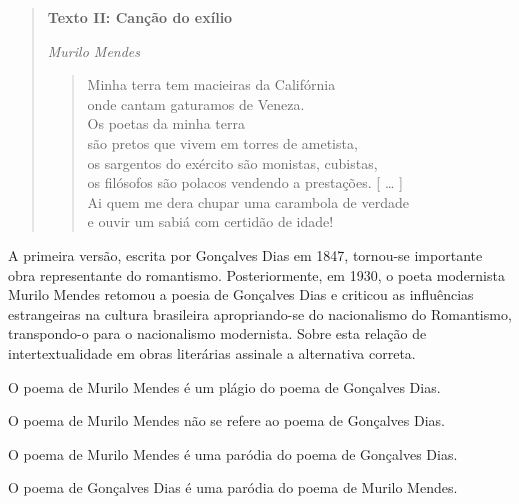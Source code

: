 


\begin{quote}

\textbf{Texto II: Canção do exílio}

\emph{Murilo Mendes}

\begin{verse}

Minha terra tem macieiras da Califórnia \\

onde cantam gaturamos de Veneza. \\

Os poetas da minha terra \\

são pretos que vivem em torres de ametista, \\

os sargentos do exército são monistas, cubistas, \\

os filósofos são polacos vendendo a prestações. {[} \ldots{} {]} \\

Ai quem me dera chupar uma carambola de verdade \\

e ouvir um sabiá com certidão de idade!

\end{verse}

\end{quote}


A primeira versão, escrita por Gonçalves Dias em 1847, tornou-se
importante obra representante do romantismo. Posteriormente, em 1930, o
poeta modernista Murilo Mendes retomou a poesia de Gonçalves Dias e
criticou as influências estrangeiras na cultura brasileira
apropriando-se do nacionalismo do Romantismo, transpondo-o para o
nacionalismo modernista. Sobre esta relação de
intertextualidade em obras literárias assinale a alternativa correta.

\begin{escolha}

  \item O poema de Murilo Mendes é um plágio do poema de Gonçalves Dias.

  \item O poema de Murilo Mendes não se refere ao poema de Gonçalves Dias.

  \item O poema de Murilo Mendes é uma paródia do poema de Gonçalves Dias.

  \item O poema de Gonçalves Dias é uma paródia do poema de Murilo Mendes.

\end{escolha}


